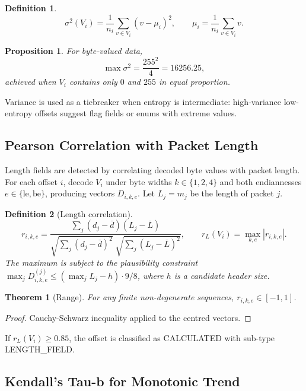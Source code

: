 \documentclass[11pt,a4paper]{article}
\newtheorem{definition}{Definition}
\newtheorem{theorem}{Theorem}
\newtheorem{proposition}{Proposition}
\begin{document}
\begin{definition}
\[
\sigma^2(V_i) = \frac{1}{n_i} \sum_{v \in V_i} (v - \mu_i)^2,\qquad
\mu_i = \frac{1}{n_i} \sum_{v \in V_i} v.
\]
\end{definition}

\begin{proposition}
For byte-valued data,
\[
\max \sigma^2 = \frac{255^2}{4} = 16256.25,
\]
achieved when $V_i$ contains only $0$ and $255$ in equal proportion.
\end{proposition}

Variance is used as a tiebreaker when entropy is intermediate: high-variance
low-entropy offsets suggest flag fields or enums with extreme values.

\subsection{Pearson Correlation with Packet Length}

Length fields are detected by correlating decoded byte values with packet
length. For each offset $i$, decode $V_i$ under byte widths
$k \in \{1,2,4\}$ and both endiannesses $e \in \{\text{le}, \text{be}\}$,
producing vectors $D_{i,k,e}$. Let $L_j = m_j$ be the length of packet $j$.

\begin{definition}[Length correlation]
\[
r_{i,k,e} = \frac{\sum_j (d_j - \bar d)(L_j - \bar L)}
                 {\sqrt{\sum_j (d_j - \bar d)^2}\;
                  \sqrt{\sum_j (L_j - \bar L)^2}},
\qquad
r_L(V_i) = \max_{k,e} |r_{i,k,e}|.
\]
The maximum is subject to the plausibility constraint
$\max_j D_{i,k,e}^{(j)} \leq (\max_j L_j - h) \cdot 9/8$,
where $h$ is a candidate header size.
\end{definition}

\begin{theorem}[Range]
For any finite non-degenerate sequences, $r_{i,k,e} \in [-1, 1]$.
\end{theorem}

\begin{proof}
Cauchy-Schwarz inequality applied to the centred vectors.
\end{proof}

If $r_L(V_i) \geq 0.85$, the offset is classified as CALCULATED with
sub-type LENGTH\_FIELD.

\subsection{Kendall's Tau-b for Monotonic Trend}
\end{document}

